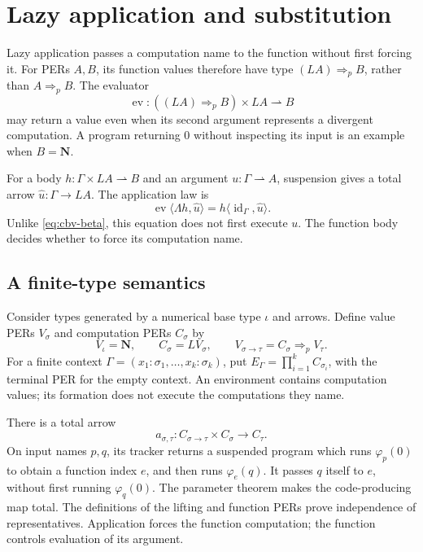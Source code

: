 \documentclass[11pt]{article}
\theoremstyle{definition}
\newcommand{\id}{\operatorname{id}}
\newcommand{\ev}{\operatorname{ev}}
\newcommand{\pArr}{\mathbin{\Rightarrow_{\!p}}}
\begin{document}
\section{Lazy application and substitution}\label{sec:lazy}

Lazy application passes a computation name to the function without
first forcing it. For PERs $A,B$, its function values therefore have
type $(LA)\pArr B$, rather than $A\pArr B$. The evaluator
\[
 \ev:((LA)\pArr B)\times LA\rightharpoonup B
\]
may return a value even when its second argument represents a divergent
computation. A program returning $0$ without inspecting its input
is an example when $B=\mathbf N$.

For a body $h:\Gamma\times LA\rightharpoonup B$ and an argument
$u:\Gamma\rightharpoonup A$, suspension gives a total arrow
$\widehat u:\Gamma\to LA$. The application law is
\begin{equation}\label{eq:lazy-body-beta}
 \ev\langle\Lambda h,\widehat u\rangle
       =h\langle\id_\Gamma,\widehat u\rangle.
\end{equation}
Unlike \eqref{eq:cbv-beta}, this equation does not first execute $u$.
The function body decides whether to force its computation name.

\subsection{A finite-type semantics}

Consider types generated by a numerical base type $\iota$ and arrows.
Define value PERs $V_\sigma$ and computation PERs $C_\sigma$ by
\[
 V_\iota=\mathbf N,\qquad C_\sigma=LV_\sigma,\qquad
 V_{\sigma\to\tau}=C_\sigma\pArr V_\tau.
\]
For a finite context
$\Gamma=(x_1:\sigma_1,\ldots,x_k:\sigma_k)$, put
$E_\Gamma=\prod_{i=1}^k C_{\sigma_i}$, with the terminal PER
for the empty context. An environment contains computation values;
its formation does not execute the computations they name.

There is a total arrow
\begin{equation}\label{eq:lazy-app}
 a_{\sigma,\tau}:C_{\sigma\to\tau}\times C_\sigma\to C_\tau.
\end{equation}
On input names $p,q$, its tracker returns a suspended program which
runs $\varphi_p(0)$ to obtain a function index $e$, and then runs
$\varphi_e(q)$. It passes $q$ itself to $e$, without first running
$\varphi_q(0)$. The parameter theorem makes the code-producing map
total. The definitions of the lifting and function PERs prove
independence of representatives. Application forces the function
computation; the function controls evaluation of its argument.
\end{document}
